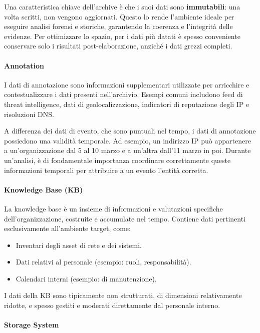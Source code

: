 Una caratteristica chiave dell'archive è che i suoi dati sono \textbf{immutabili}:
una volta scritti, non vengono aggiornati.
Questo lo rende l'ambiente ideale per eseguire analisi forensi e storiche,
garantendo la coerenza e l'integrità delle evidenze.
Per ottimizzare lo spazio, per i dati più datati è spesso conveniente conservare
solo i risultati post-elaborazione, anziché i dati grezzi completi.

\paragraph{Annotation}

I dati di annotazione sono informazioni supplementari utilizzate per arricchire
e contestualizzare i dati presenti nell'archivio.
Esempi comuni includono feed di threat intelligence, dati di geolocalizzazione,
indicatori di reputazione degli IP e risoluzioni DNS.

A differenza dei dati di evento, che sono puntuali nel tempo, i dati di annotazione
possiedono una validità temporale.
Ad esempio, un indirizzo IP può appartenere a un'organizzazione dal 5 al 10 marzo
e a un'altra dall'11 marzo in poi.
Durante un'analisi, è di fondamentale importanza coordinare correttamente
queste informazioni temporali per attribuire a un evento l'entità corretta.

\paragraph{Knowledge Base (KB)}

La knowledge base è un insieme di informazioni e valutazioni specifiche
dell'organizzazione, costruite e accumulate nel tempo.
Contiene dati pertinenti esclusivamente all'ambiente target, come:

\begin{itemize}
\item Inventari degli asset di rete e dei sistemi.
\item Dati relativi al personale (esempio: ruoli, responsabilità).
\item Calendari interni (esempio: di manutenzione).
\end{itemize}

I dati della KB sono tipicamente non strutturati, di dimensioni relativamente ridotte,
e spesso gestiti e moderati direttamente dal personale interno.

\paragraph
{Storage System}

